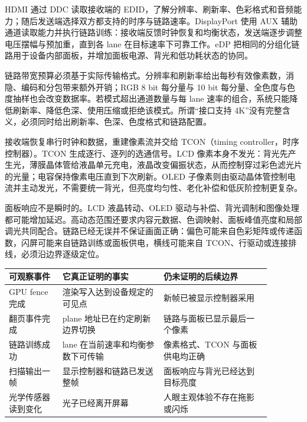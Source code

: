 
HDMI 通过 DDC 读取接收端的 EDID，了解分辨率、刷新率、色彩格式和音频能力；随后发送端选择双方都支持的时序与链路速率。DisplayPort 使用 AUX 辅助通道读取能力并执行链路训练：接收端反馈时钟恢复和均衡状态，发送端逐步调整电压摆幅与预加重，直到各 lane 在目标速率下可靠工作。eDP 把相同的分组化链路用于设备内部面板，并增加面板电源、背光和低功耗状态的协同。

链路带宽预算必须基于实际传输格式。分辨率和刷新率给出每秒有效像素数，消隐、编码和分包带来额外开销；RGB 8 bit 每分量与 10 bit 每分量、全色度与色度抽样也会改变数据率。若模式超出通道数量与每 lane 速率的组合，系统只能降低刷新率、降低色深、使用压缩或拒绝该模式。所谓“接口支持 4K”没有完整含义，必须同时给出刷新率、色深、色度格式和链路配置。


接收端恢复串行时钟和数据，重建像素流并交给 TCON（timing controller，时序控制器）。TCON 生成逐行、逐列的选通信号。LCD 像素本身不发光：背光先产生光，薄膜晶体管给液晶单元充电，液晶改变偏振状态，从而控制穿过彩色滤光片的光量；电容保持像素电压直到下次刷新。OLED 子像素则由驱动晶体管控制电流并主动发光，不需要统一背光，但亮度均匀性、老化补偿和低灰阶控制更复杂。

面板响应不是瞬时的。LCD 液晶转动、OLED 驱动与补偿、背光调制和图像处理都可能增加延迟。高动态范围还要求内容元数据、色调映射、面板峰值亮度和局部调光共同配合。链路已经无误并不保证画面正确：偏色可能来自色彩矩阵或传递函数，闪屏可能来自链路训练或面板供电，横线可能来自 TCON、行驱动或连接排线，必须沿边界逐级定位。

\begin{longtable}{L{0.18\linewidth}L{0.34\linewidth}L{0.36\linewidth}}
\toprule
可观察事件 & 它真正证明的事实 & 仍未证明的后续边界 \\
\midrule
GPU fence 完成 & 渲染写入达到设备规定的可见点 & 新帧已被显示控制器采用 \\\tablerowrule
翻页事件完成 & plane 地址已在约定刷新边界切换 & 链路与面板已显示最后一个像素 \\\tablerowrule
链路训练成功 & lane 在当前速率和均衡参数下可传输 & 像素格式、TCON 与面板供电均正确 \\\tablerowrule
扫描输出一帧 & 显示控制器和链路已发送整帧 & 面板响应与背光已经达到目标亮度 \\\tablerowrule
光学传感器读到变化 & 光子已经离开屏幕 & 人眼主观体验不存在拖影或闪烁 \\
\bottomrule
\end{longtable}

